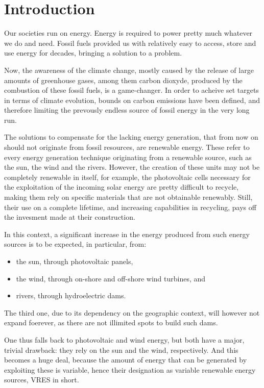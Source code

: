 \section{Introduction}

Our societies run on energy. Energy is required to power pretty much whatever we do and need. Fossil fuels provided us with relatively easy to access, store and use energy for decades, bringing a solution to a problem.

Now, the awareness of the climate change, mostly caused by the release of large amounts of greenhouse gases, among them carbon dioxyde, produced by the combustion of these fossil fuels, is a game-changer. In order to acheive set targets in terms of climate evolution, bounds on carbon emissions have been defined, and therefore limiting the prevously endless source of fossil energy in the very long run.

The solutions to compensate for the lacking energy generation, that from now on should not originate from fossil resources, are renewable energy. These refer to every energy generation technique originating from a renewable source, such as the sun, the wind and the rivers. However, the creation of these units may not be completely renewable in itself, for example, the photovoltaic cells necessary for the exploitation of the incoming solar energy are pretty difficult to recycle, making them rely on specific materials that are not obtainable renewably. Still, their use on a complete lifetime, and increasing capabilities in recycling, pays off the invesment made at their construction.

In this context, a significant increase in the energy produced from such energy sources is to be expected, in particular, from:
\begin{itemize}
    \item the sun, through photovoltaic panels,
    \item the wind, through on-shore and off-shore wind turbines, and
    \item rivers, through hydroelectric dams.
\end{itemize}

The third one, due to its dependency on the geographic context, will however not expand foerever, as there are not illimited spots to build such dams.

One thus falls back to photovoltaic and wind energy, but both have a major, trivial drawback: they rely on the sun and the wind, respectively. And this becomes a huge deal, because the amount of energy that can be generated by exploiting these is variable, hence their designation as variable renewable energy sources, VRES in short.

